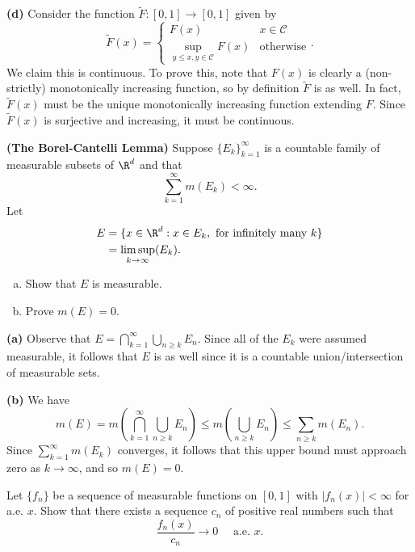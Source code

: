 \documentclass[11pt,letterpaper]{article}
\begin{document}
\begin{solution}
    \textbf{(d)} Consider the function $\widetilde{F} : [0,1] \to [0,1]$ given by
    \[
        \widetilde{F}(x) = \begin{cases}
            F(x) & x\in \mathcal{C} \\
            \sup_{y\leq x, y\in \mathcal{C}} F(x) & \textrm{otherwise}
        \end{cases}
    .\]
    We claim this is continuous. To prove this, note that $F(x)$ is clearly a (non-strictly) monotonically increasing function, so by definition $\widetilde{F}$ is as well. In fact, $\widetilde{F}(x)$ must be the unique monotonically increasing function extending $F$. Since $\widetilde{F}(x)$ is surjective and increasing, it must be continuous.
\end{solution}

\begin{problem}{\textbf{(The Borel-Cantelli Lemma)}}
    Suppose $\{E_k\}^\infty_{k=1}$ is a countable family of measurable subsets of $\R^d$ and that
    \[
        \sum^\infty_{k=1} m(E_k) < \infty
    .\] 
Let 
\[
    \begin{aligned}
        E &= \{x\in \R^d : x\in E_k, \textrm{ for infinitely many }k\}\\
        &= \limsup_{k\to \infty}(E_k).
    \end{aligned}
\] 
\begin{enumerate}[(a)]
    \item Show that $E$ is measurable.
    \item Prove $m(E)=0$.
\end{enumerate}
\end{problem}

\begin{solution}
    \textbf{(a)} Observe that $E=\bigcap^\infty_{k=1}\bigcup_{n\geq k}E_n$. Since all of the $E_k$ were assumed measurable, it follows that $E$ is as well since it is a countable union/intersection of measurable sets.

    \textbf{(b)} We have
    \[
        m(E)=m\left(\bigcap^\infty_{k=1}\bigcup_{n\geq k}E_n\right)\leq m\left(\bigcup_{n\geq k}E_n\right)\leq \sum_{n\geq k}m(E_n)
    .\] 
    Since $\sum^\infty_{k=1}m(E_k)$ converges, it follows that this upper bound must approach zero as $k\to\infty$, and so $m(E)=0$. 
\end{solution}

\begin{problem}
    Let $\{f_n\}$ be a sequence of measurable functions on $[0,1]$ with $|f_n(x)|<\infty$ for a.e. $x$. Show that there exists a sequence $c_n$ of positive real numbers such that
    \[
        \frac{f_n(x)}{c_n} \to 0\quad\textrm{ a.e. }x
    .\]
\end{problem}
\end{document}
